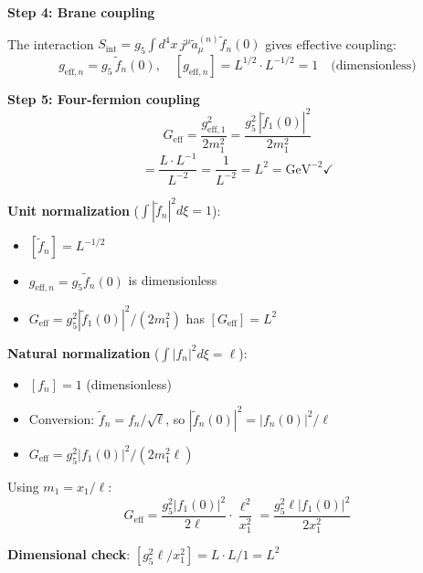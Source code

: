 \textbf{Step 4: Brane coupling}

The interaction $S_{\text{int}} = g_5 \int d^4x \, j^\mu \tilde{a}_\mu^{(n)} \tilde{f}_n(0)$
gives effective coupling:
\begin{equation}
    g_{\text{eff},n} = g_5 \, \tilde{f}_n(0), \quad
    [g_{\text{eff},n}] = L^{1/2} \cdot L^{-1/2} = 1 \quad \text{(dimensionless)}
\end{equation}

\textbf{Step 5: Four-fermion coupling}
\begin{equation}
    G_{\text{eff}} = \frac{g_{\text{eff},1}^2}{2 m_1^2} = \frac{g_5^2 \, |\tilde{f}_1(0)|^2}{2 m_1^2}
\end{equation}
\begin{equation}
    [G_{\text{eff}}] = \frac{L \cdot L^{-1}}{L^{-2}} = \frac{1}{L^{-2}} = L^2 = \text{GeV}^{-2} \checkmark
\end{equation}

\begin{tcolorbox}[colback=green!5!white, colframe=green!50!black,
    title=\textbf{Dimensional Summary}]

\textbf{Unit normalization} ($\int |\tilde{f}_n|^2 d\xi = 1$):
\begin{itemize}
    \item $[\tilde{f}_n] = L^{-1/2}$
    \item $g_{\text{eff},n} = g_5 \tilde{f}_n(0)$ is dimensionless
    \item $G_{\text{eff}} = g_5^2 |\tilde{f}_1(0)|^2 / (2m_1^2)$ has $[G_{\text{eff}}] = L^2$
\end{itemize}

\textbf{Natural normalization} ($\int |f_n|^2 d\xi = \ell$):
\begin{itemize}
    \item $[f_n] = 1$ (dimensionless)
    \item Conversion: $\tilde{f}_n = f_n / \sqrt{\ell}$, so $|\tilde{f}_n(0)|^2 = |f_n(0)|^2 / \ell$
    \item $G_{\text{eff}} = g_5^2 |f_1(0)|^2 / (2 m_1^2 \ell)$
\end{itemize}

Using $m_1 = x_1/\ell$:
\begin{equation}
    G_{\text{eff}} = \frac{g_5^2 |f_1(0)|^2}{2 \ell} \cdot \frac{\ell^2}{x_1^2}
    = \frac{g_5^2 \ell |f_1(0)|^2}{2 x_1^2}
\end{equation}

\textbf{Dimensional check}:
$[g_5^2 \ell / x_1^2] = L \cdot L / 1 = L^2$ \checkmark

\end{tcolorbox}

